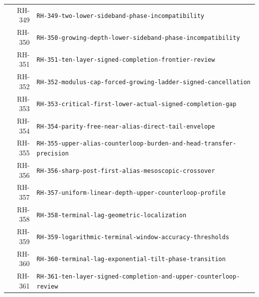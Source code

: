 \begin{longtable}{r >{\raggedright\arraybackslash}p{}}
RH-349 & \texttt{RH-\allowbreak{}349-\allowbreak{}two-\allowbreak{}lower-\allowbreak{}sideband-\allowbreak{}phase-\allowbreak{}incompatibility}\\
RH-350 & \texttt{RH-\allowbreak{}350-\allowbreak{}growing-\allowbreak{}depth-\allowbreak{}lower-\allowbreak{}sideband-\allowbreak{}phase-\allowbreak{}incompatibility}\\
RH-351 & \texttt{RH-\allowbreak{}351-\allowbreak{}ten-\allowbreak{}layer-\allowbreak{}signed-\allowbreak{}completion-\allowbreak{}frontier-\allowbreak{}review}\\
RH-352 & \texttt{RH-\allowbreak{}352-\allowbreak{}modulus-\allowbreak{}cap-\allowbreak{}forced-\allowbreak{}growing-\allowbreak{}ladder-\allowbreak{}signed-\allowbreak{}cancellation}\\
RH-353 & \texttt{RH-\allowbreak{}353-\allowbreak{}critical-\allowbreak{}first-\allowbreak{}lower-\allowbreak{}actual-\allowbreak{}signed-\allowbreak{}completion-\allowbreak{}gap}\\
RH-354 & \texttt{RH-\allowbreak{}354-\allowbreak{}parity-\allowbreak{}free-\allowbreak{}near-\allowbreak{}alias-\allowbreak{}direct-\allowbreak{}tail-\allowbreak{}envelope}\\
RH-355 & \texttt{RH-\allowbreak{}355-\allowbreak{}upper-\allowbreak{}alias-\allowbreak{}counterloop-\allowbreak{}burden-\allowbreak{}and-\allowbreak{}head-\allowbreak{}transfer-\allowbreak{}precision}\\
RH-356 & \texttt{RH-\allowbreak{}356-\allowbreak{}sharp-\allowbreak{}post-\allowbreak{}first-\allowbreak{}alias-\allowbreak{}mesoscopic-\allowbreak{}crossover}\\
RH-357 & \texttt{RH-\allowbreak{}357-\allowbreak{}uniform-\allowbreak{}linear-\allowbreak{}depth-\allowbreak{}upper-\allowbreak{}counterloop-\allowbreak{}profile}\\
RH-358 & \texttt{RH-\allowbreak{}358-\allowbreak{}terminal-\allowbreak{}lag-\allowbreak{}geometric-\allowbreak{}localization}\\
RH-359 & \texttt{RH-\allowbreak{}359-\allowbreak{}logarithmic-\allowbreak{}terminal-\allowbreak{}window-\allowbreak{}accuracy-\allowbreak{}thresholds}\\
RH-360 & \texttt{RH-\allowbreak{}360-\allowbreak{}terminal-\allowbreak{}lag-\allowbreak{}exponential-\allowbreak{}tilt-\allowbreak{}phase-\allowbreak{}transition}\\
RH-361 & \texttt{RH-\allowbreak{}361-\allowbreak{}ten-\allowbreak{}layer-\allowbreak{}signed-\allowbreak{}completion-\allowbreak{}and-\allowbreak{}upper-\allowbreak{}counterloop-\allowbreak{}review}\\
\bottomrule
\end{longtable}

